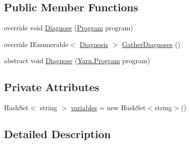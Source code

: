 \subsection*{Public Member Functions}
\begin{DoxyCompactItemize}
\item 
override void \hyperlink{a00165_a980f0e64bc5ad171c35ec19bdf838b5c}{Diagnose} (\hyperlink{a00126}{Program} program)
\item 
override I\-Enumerable$<$ \hyperlink{a00071}{Diagnosis} $>$ \hyperlink{a00165_ab84e7a8e68740379dee12a51dca69b07}{Gather\-Diagnoses} ()
\item 
abstract void \hyperlink{a00033_aba4a36cb823b11ee491074e26477d084}{Diagnose} (\hyperlink{a00126}{Yarn.\-Program} program)
\end{DoxyCompactItemize}
\subsection*{Private Attributes}
\begin{DoxyCompactItemize}
\item 
Hash\-Set$<$ string $>$ \hyperlink{a00165_a64ed6c3394c474b6cf5804a35f560746}{variables} = new Hash\-Set$<$string$>$()
\end{DoxyCompactItemize}


\subsection{Detailed Description}


